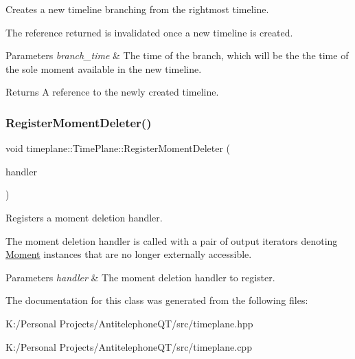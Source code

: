 Creates a new timeline branching from the rightmost timeline. 

The reference returned is invalidated once a new timeline is created. 
\begin{DoxyParams}{Parameters}
{\em branch\+\_\+time} & The time of the branch, which will be the the time of the sole moment available in the new timeline. \\
\hline
\end{DoxyParams}
\begin{DoxyReturn}{Returns}
A reference to the newly created timeline. 
\end{DoxyReturn}
\mbox{\label{classtimeplane_1_1_time_plane_a22be7b27d461dcb849f48c149a044502}} 
\subsubsection{\texorpdfstring{Register\+Moment\+Deleter()}{RegisterMomentDeleter()}}
{\footnotesize\ttfamily void timeplane\+::\+Time\+Plane\+::\+Register\+Moment\+Deleter (\begin{DoxyParamCaption}\item[{Moment\+Deleter\+Fn}]{handler }\end{DoxyParamCaption})\hspace{0.3cm}{\ttfamily [inline]}}



Registers a moment deletion handler. 

The moment deletion handler is called with a pair of output iterators denoting {\ttfamily \hyperlink{classtimeplane_1_1_moment}{Moment}} instances that are no longer externally accessible. 
\begin{DoxyParams}{Parameters}
{\em handler} & The moment deletion handler to register. \\
\hline
\end{DoxyParams}


The documentation for this class was generated from the following files\+:\begin{DoxyCompactItemize}
\item 
K\+:/\+Personal Projects/\+Antitelephone\+Q\+T/src/timeplane.\+hpp\item 
K\+:/\+Personal Projects/\+Antitelephone\+Q\+T/src/timeplane.\+cpp\end{DoxyCompactItemize}
